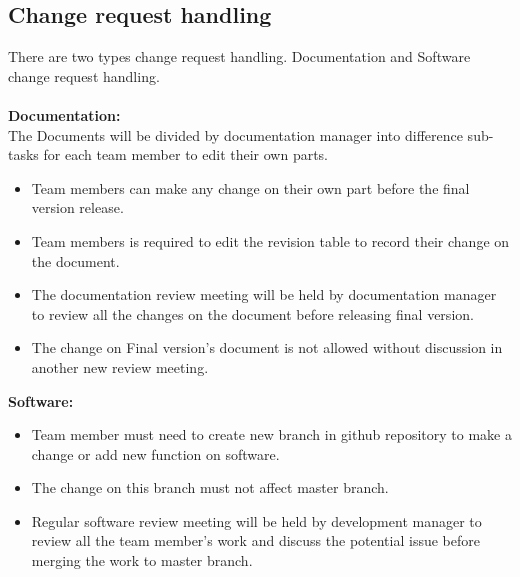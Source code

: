 \subsection{Change request handling}
There are two types change request handling. Documentation and Software change request handling.\\\\
\textbf{Documentation:}\\
The Documents will be divided by documentation manager into difference sub-tasks for each team member to edit their own parts. 
\begin{itemize}
\item Team members can make any change on their own part before the final version release. 

\item Team members is required to edit the revision table to record their change on the document. 

\item The documentation review meeting will be held by documentation manager to review all the changes on the document before releasing final version.

\item The change on Final version's document is not allowed without discussion in another new review meeting. 
\end{itemize}
\textbf{Software:}
\begin{itemize}
\item Team member must need to create new branch in github repository to make a change or add new function on software. 
\item The change on this branch must not affect master branch.
\item Regular software review meeting will be held by development manager to review all the team member’s work and discuss the potential issue before merging the work to master branch.
\end{itemize}